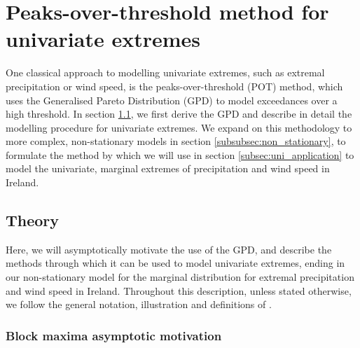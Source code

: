 \documentclass{article}
\numberwithin{equation}{section}
\begin{document}
\newpage
\section{Peaks-over-threshold method for univariate extremes}\label{sec:uni}

One classical approach to modelling univariate extremes, such as extremal precipitation or wind speed, is the peaks-over-threshold (POT) method, which uses the Generalised Pareto Distribution (GPD) to model exceedances over a high threshold.
In section \ref{subsec:uni_theory}, we first derive the GPD and describe in detail the modelling procedure for univariate extremes.
We expand on this methodology to more complex, non-stationary models in section \ref{subsubsec:non_stationary}, to formulate the method by which we will use in section \ref{subsec:uni_application} to model the univariate, marginal extremes of precipitation and wind speed in Ireland.

\subsection{Theory} \label{subsec:uni_theory}

Here, we will asymptotically motivate the use of the GPD, and describe the methods through which it can be used to model univariate extremes, ending in our non-stationary model for the marginal distribution for extremal precipitation and wind speed in Ireland.
Throughout this description, unless stated otherwise, we follow the general notation, illustration and definitions of \cite{Coles2001}.

\subsubsection{Block maxima asymptotic motivation} \label{subsubsec:asymptotic}

\end{document}
